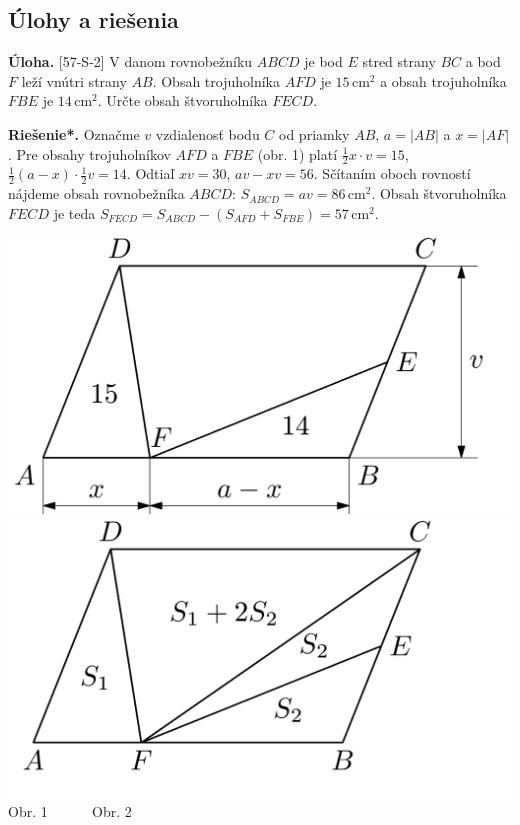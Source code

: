 \documentclass[11pt,a4paper,oneside,final]{book}
\newcommand{\ul}{\textbf{Úloha.} }
\newcommand{\rieh}{\textbf{Riešenie*.} }
\begin{document}
\subsection*{Úlohy a riešenia}
\begin{tcolorbox}[breakable,notitle,boxrule=0pt,colback=light-gray,colframe=light-gray]\ul [57-S-2] V danom rovnobežníku $ABCD$ je bod $E$ stred strany $BC$ a bod $F$ leží vnútri strany $AB$. Obsah trojuholníka $AFD$ je $15$\,cm$^2$ a obsah trojuholníka $FBE$ je $14$\,cm$^2$. Určte obsah štvoruholníka $FECD$.

\end{tcolorbox}

\rieh Označme $v$ vzdialenosť bodu $C$ od priamky $AB$, $a = |AB|$ a $x = |AF|$. Pre obsahy trojuholníkov $AFD$ a $FBE$ (obr. 1) platí $\frac{1}{2}x\cdot v = 15$, $\frac{1}{2}(a - x) \cdot \frac{1}{2}v = 14$. Odtiaľ $xv = 30$, $av - xv = 56$. Sčítaním oboch rovností nájdeme obsah rovnobežníka $ABCD$: $S_{ABCD} = av = 86$\,cm$^2$. Obsah štvoruholníka $FECD$ je teda $S_{FECD} = S_{ABCD}- (S_{AFD} + S_ {FBE}) = 57$\,cm$^2.$
\begin{center}
\includegraphics[scale=0.3]{57S21} \includegraphics[scale=0.3]{57S22}\\

Obr. 1  \ \ \ \ \ \hspace{130pt} Obr. 2
\end{center}
\end{document}
